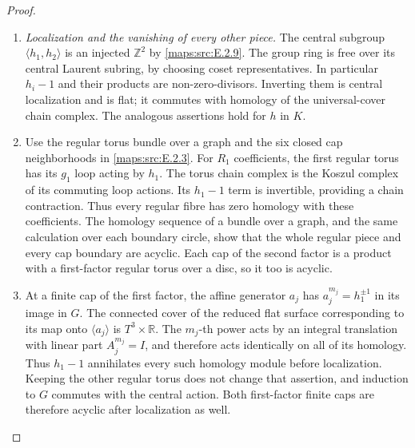 \documentclass[11pt,a4paper]{article}
\numberwithin{equation}{section}
\theoremstyle{definition}
\begin{document}
\begin{proof}
\begin{enumerate}[label=\arabic*.,leftmargin=*]
\item \emph{Localization and the vanishing of every other piece.}
The central subgroup $\langle h_1,h_2\rangle$ is an injected
$\mathbb Z^2$ by \ref{maps:src:E.2.9}. The group ring is free over its central
Laurent subring, by choosing coset representatives. In particular
$h_i-1$ and their products are non-zero-divisors. Inverting them
is central localization and is flat; it commutes with homology
of the universal-cover chain complex. The analogous assertions
hold for $h$ in $K$.

\item Use the regular torus bundle over a graph and the six closed
cap neighborhoods in \ref{maps:src:E.2.3}. For $R_1$ coefficients, the first
regular torus has its $g_1$ loop acting by $h_1$. The torus
chain complex is the Koszul complex of its commuting loop
actions. Its $h_1-1$ term is invertible, providing a chain
contraction. Thus every regular fibre has zero homology with
these coefficients. The homology sequence of a bundle over
a graph, and the same calculation over each boundary circle,
show that the whole regular piece and every cap boundary are
acyclic. Each cap of the second factor is a product with a
first-factor regular torus over a disc, so it too is acyclic.

\item At a finite cap of the first factor, the affine generator
$a_j$ has $a_j^{m_j}=h_1^{\pm1}$ in its image in $G$.
The connected cover of the reduced flat surface corresponding
to its map onto $\langle a_j\rangle$ is $T^3\times\mathbb R$.
The $m_j$-th power acts by an integral translation with linear
part $A_j^{m_j}=I$, and therefore acts identically on all of
its homology. Thus $h_1-1$ annihilates every such homology
module before localization. Keeping the other regular torus does not change that assertion, and induction to $G$ commutes
with the central action. Both first-factor finite caps are
therefore acyclic after localization as well. 


\end{enumerate}
\end{proof}
\end{document}
